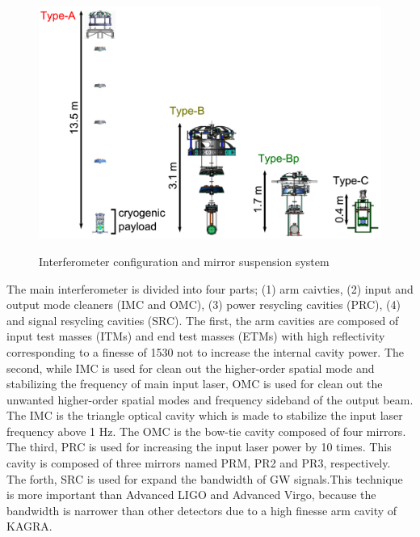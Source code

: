 \begin{figure}[p]
\begin{minipage}{15cm}
\begin{center}
      \includegraphics[width=13cm]{./img_chap6/img601b.png}
      \label{img:img601b}
    \end{center}
  \end{minipage}
  \caption{Interferometer configuration and mirror suspension system}{}
\end{figure}
The main interferometer is divided into four parts; (1) arm caivties, (2) input and output mode cleaners (IMC and OMC), (3) power resycling cavities (PRC), (4) and signal resycling cavities (SRC). The first, the arm cavities are composed of input test masses (ITMs) and end test masses (ETMs) with high reflectivity corresponding to a finesse of 1530 not to increase the internal cavity power. The second, while IMC is used for clean out the higher-order spatial mode and stabilizing the frequency of main input laser, OMC is used for clean out the unwanted higher-order spatial modes and frequency sideband of the output beam. The IMC is the triangle optical cavity which is made to stabilize the input laser frequency above 1 Hz. The OMC is the bow-tie cavity composed of four mirrors. The third, PRC is used for increasing the input laser power by 10 times. This cavity is composed of three mirrors named PRM, PR2 and PR3, respectively. The forth, SRC is used for expand the bandwidth of GW signals.This technique is more important than Advanced LIGO and Advanced Virgo, because the bandwidth is narrower than other detectors due to a high finesse arm cavity of KAGRA. 

